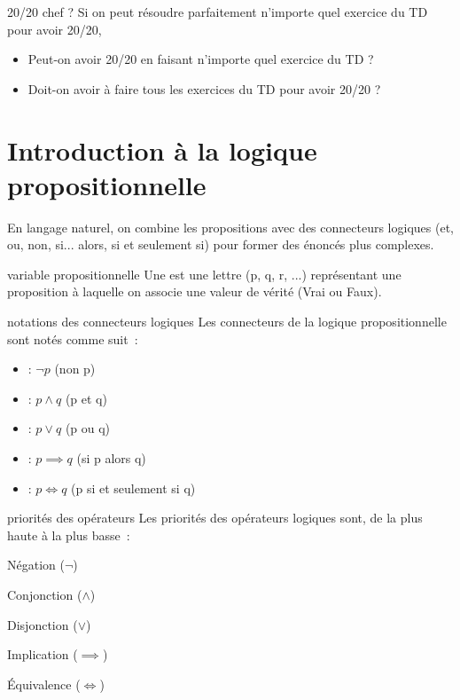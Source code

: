 \begin{exemple}{}{20/20 chef ?}
    Si on peut résoudre parfaitement n'importe quel exercice du TD pour avoir 20/20, 
    \begin{itemize}
        \item Peut-on avoir 20/20 en faisant n'importe quel exercice du TD ?
        \item Doit-on avoir à faire tous les exercices du TD pour avoir 20/20 ?
    \end{itemize}
\end{exemple}

\section{Introduction à la logique propositionnelle}

En langage naturel, on combine les propositions avec des connecteurs logiques (et, ou, non, si... alors, si et seulement si) pour former des énoncés plus complexes.

\begin{definition}{}{variable propositionnelle}
    Une  est une lettre (p, q, r, ...) représentant une proposition à laquelle on associe une valeur de vérité (Vrai ou Faux).
\end{definition}

\begin{definition}{}{notations des connecteurs logiques}
    Les connecteurs de la logique propositionnelle sont notés comme suit~:
    \begin{itemize}
        \item {} : $\neg p$ (non p)
        \item {} : $p \land q$ (p et q)
        \item {} : $p \lor q$ (p ou q)
        \item {} : $p \implies q$ (si p alors q)
        \item {} : $p \iff q$ (p si et seulement si q)
    \end{itemize}
\end{definition}

\begin{proposition}{}{priorités des opérateurs}
    Les priorités des opérateurs logiques sont, de la plus haute à la plus basse~:
    \begin{enumeratebf}
        \item Négation ($\neg$)
        \item Conjonction ($\land$)
        \item Disjonction ($\lor$)
        \item Implication ($\implies$)
        \item Équivalence ($\iff$)
    \end{enumeratebf}
\end{proposition}


